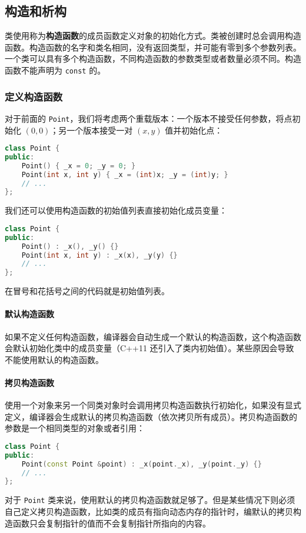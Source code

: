 \documentclass[hyperref,UTF8]{article}
\begin{document}
\subsection{构造和析构} \label{sec:constructor}

类使用称为\textbf{构造函数}的成员函数定义对象的初始化方式。类被创建时总会调用构造函数。构造函数的名字和类名相同，没有返回类型，并可能有零到多个参数列表。一个类可以具有多个构造函数，不同构造函数的参数类型或者数量必须不同。构造函数不能声明为 \texttt{const} 的。

\subsubsection{定义构造函数}

对于前面的 \texttt{Point}，我们将考虑两个重载版本：一个版本不接受任何参数，将点初始化 $(0,0)$；另一个版本接受一对 $(x,y)$ 值并初始化点：
\begin{lstlisting}[language=c++]
class Point {
public:
    Point() { _x = 0; _y = 0; }
    Point(int x, int y) { _x = (int)x; _y = (int)y; }
    // ...
};
\end{lstlisting}
我们还可以使用构造函数的初始值列表直接初始化成员变量：
\begin{lstlisting}[language=c++]
class Point {
public:
    Point() : _x(), _y() {}
    Point(int x, int y) : _x(x), _y(y) {}
    // ...
};
\end{lstlisting}
在冒号和花括号之间的代码就是初始值列表。

\paragraph{默认构造函数} 如果不定义任何构造函数，编译器会自动生成一个默认的构造函数，这个构造函数会默认初始化类中的成员变量（C++11 还引入了类内初始值）。某些原因会导致不能使用默认的构造函数。

\paragraph{拷贝构造函数} 使用一个对象来另一个同类对象时会调用拷贝构造函数执行初始化，如果没有显式定义，编译器会生成默认的拷贝构造函数（依次拷贝所有成员）。拷贝构造函数的参数是一个相同类型的对象或者引用：
\begin{lstlisting}[language=c++]
class Point {
public:
    Point(const Point &point) : _x(point._x), _y(point._y) {}
    // ...
};
\end{lstlisting}
对于 \texttt{Point} 类来说，使用默认的拷贝构造函数就足够了。但是某些情况下则必须自己定义拷贝构造函数，比如类的成员有指向动态内存的指针时，编默认的拷贝构造函数只会复制指针的值而不会复制指针所指向的内容。
\end{document}
